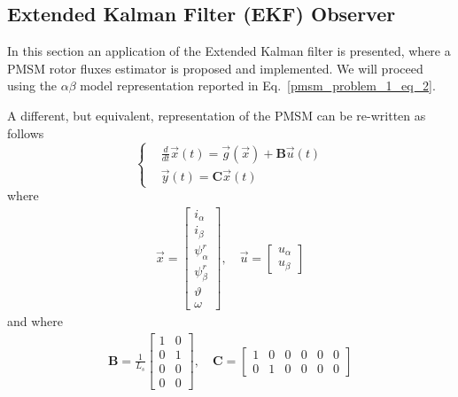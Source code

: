 \documentclass[12pt,a4paper,oneside]{book}
\begin{document}
\begin{onehalfspace}
\subsection{Extended Kalman Filter (EKF) Observer}\label{PMSM_EKF}
In this section an application of the Extended Kalman filter is presented, where a PMSM rotor fluxes estimator is proposed and implemented. We will proceed using the  $\alpha\beta$ model representation reported in Eq.~\eqref{pmsm_problem_1_eq_2}. 

A different, but equivalent, representation of the PMSM can be re-written as follows
\begin{equation}\label{pmsm_problem_1_eq_5}
	\left\lbrace \begin{aligned}
		&\frac{d}{dt}\vec{x}(t)=\vec{g}(\vec{x})+\mathbf{B}\vec{u}(t)
		\\[6pt]
		&\vec{y}(t) = \mathbf{C}\vec{x}(t)
	\end{aligned}\right. 
\end{equation} 
where 
\begin{equation}\label{pmsm_problem_1_eq_6}
	\begin{aligned}
		\vec{x}=\begin{bmatrix} i_\alpha \\[6pt] i_\beta \\[6pt] \psi_\alpha^r 
			\\[6pt] \psi_\beta^r \\[6pt] \vartheta \\[6pt] \omega \end{bmatrix},\quad
		\vec{u}=\begin{bmatrix} u_\alpha \\[6pt] u_\beta \end{bmatrix}
	\end{aligned}
\end{equation}
and where
\begin{equation}\label{pmsm_problem_1_eq_7}
	\begin{aligned}
		\mathbf{B} = \frac{1}{L_s}\begin{bmatrix} 1&0 \\[6pt] 
			0&1\\[6pt] 0&0 \\[6pt] 0&0  \end{bmatrix},\quad
		\mathbf{C} = \begin{bmatrix} 1&0&0&0&0&0 \\[6pt] 0&1&0&0&0&0 
		\end{bmatrix}
	\end{aligned}

\end{equation}
\end{onehalfspace}
\end{document}
